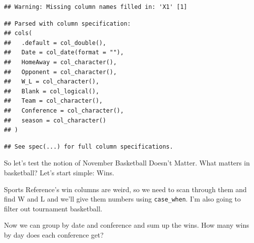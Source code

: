 \documentclass[]{book}
\newenvironment{Shaded}{\begin{snugshade}}{\end{snugshade}}
\newcommand{\DataTypeTok}[1]{\textcolor[rgb]{0.13,0.29,0.53}{#1}}
\newcommand{\DecValTok}[1]{\textcolor[rgb]{0.00,0.00,0.81}{#1}}
\newcommand{\KeywordTok}[1]{\textcolor[rgb]{0.13,0.29,0.53}{\textbf{#1}}}
\newcommand{\NormalTok}[1]{#1}
\newcommand{\OperatorTok}[1]{\textcolor[rgb]{0.81,0.36,0.00}{\textbf{#1}}}
\newcommand{\StringTok}[1]{\textcolor[rgb]{0.31,0.60,0.02}{#1}}
\begin{document}
\begin{verbatim}
## Warning: Missing column names filled in: 'X1' [1]
\end{verbatim}

\begin{verbatim}
## Parsed with column specification:
## cols(
##   .default = col_double(),
##   Date = col_date(format = ""),
##   HomeAway = col_character(),
##   Opponent = col_character(),
##   W_L = col_character(),
##   Blank = col_logical(),
##   Team = col_character(),
##   Conference = col_character(),
##   season = col_character()
## )
\end{verbatim}

\begin{verbatim}
## See spec(...) for full column specifications.
\end{verbatim}

So let's test the notion of November Basketball Doesn't Matter. What matters in basketball? Let's start simple: Wins.

Sports Reference's win columns are weird, so we need to scan through them and find W and L and we'll give them numbers using \texttt{case\_when}. I'm also going to filter out tournament basketball.

\begin{Shaded}
\end{Shaded}

Now we can group by date and conference and sum up the wins. How many wins by day does each conference get?

\begin{Shaded}
\end{Shaded}
\end{document}
